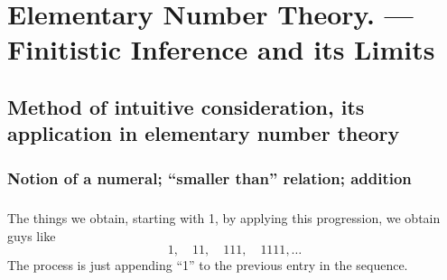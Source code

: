 \chapter{Elementary Number Theory. --- Finitistic Inference and its Limits}

\section{Method of intuitive consideration, its application in elementary number theory}

\subsection{Notion of a numeral; ``smaller than'' relation; addition}

\paragraph{} %

\paragraph{} %

\paragraph{} %

\paragraph{} %

\paragraph{} %

\paragraph{} %

\paragraph{} %

\paragraph{} %
The things we obtain, starting with 1, by applying this progression,
we obtain guys like
\begin{equation*}
1,\quad11,\quad111,\quad1111,\dots
\end{equation*}
The process is just appending ``1'' to the previous entry in the sequence.

